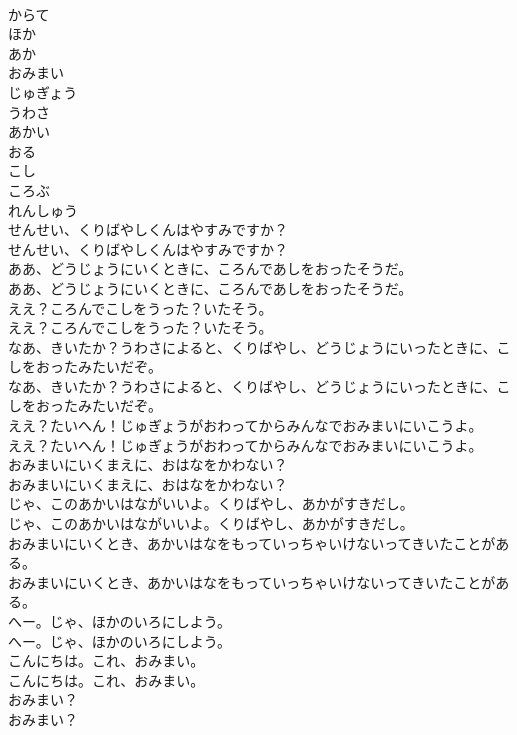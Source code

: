 \documentclass[8pt]{extreport}
\begin{document}
\begin{CJK}{UTF8}{min}
\\	からて
\\	ほか
\\	あか
\\	おみまい
\\	じゅぎょう
\\	うわさ
\\	あかい
\\	おる
\\	こし
\\	ころぶ
\\	れんしゅう
\\	せんせい、くりばやしくんはやすみですか？
\\	せんせい、くりばやしくんはやすみですか？
\\	ああ、どうじょうにいくときに、ころんであしをおったそうだ。
\\	ああ、どうじょうにいくときに、ころんであしをおったそうだ。
\\	ええ？ころんでこしをうった？いたそう。
\\	ええ？ころんでこしをうった？いたそう。
\\	なあ、きいたか？うわさによると、くりばやし、どうじょうにいったときに、こしをおったみたいだぞ。
\\	なあ、きいたか？うわさによると、くりばやし、どうじょうにいったときに、こしをおったみたいだぞ。
\\	ええ？たいへん！じゅぎょうがおわってからみんなでおみまいにいこうよ。
\\	ええ？たいへん！じゅぎょうがおわってからみんなでおみまいにいこうよ。
\\	おみまいにいくまえに、おはなをかわない？
\\	おみまいにいくまえに、おはなをかわない？
\\	じゃ、このあかいはながいいよ。くりばやし、あかがすきだし。
\\	じゃ、このあかいはながいいよ。くりばやし、あかがすきだし。
\\	おみまいにいくとき、あかいはなをもっていっちゃいけないってきいたことがある。
\\	おみまいにいくとき、あかいはなをもっていっちゃいけないってきいたことがある。
\\	へー。じゃ、ほかのいろにしよう。
\\	へー。じゃ、ほかのいろにしよう。
\\	こんにちは。これ、おみまい。
\\	こんにちは。これ、おみまい。
\\	おみまい？
\\	おみまい？

\end{CJK}
\end{document}
